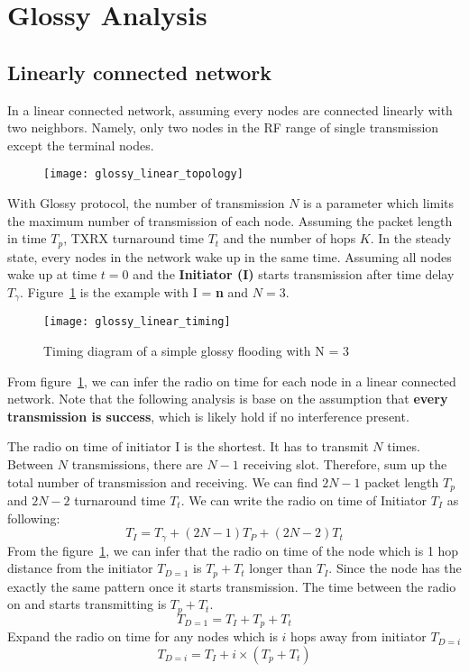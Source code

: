 \clearpage
\section{Glossy Analysis}
\subsection{Linearly connected network}
In a linear connected network, assuming every nodes are connected linearly with two neighbors.
Namely, only two nodes in the RF range of single transmission except the terminal nodes.

\begin{figure}[h]
\centering
	\texttt{[image: glossy\_linear\_topology]}
\end{figure}

With Glossy protocol, the number of transmission $N$ is a parameter which limits the maximum
number of transmission of each node. Assuming the packet length in time $T_p$, TXRX turnaround 
time $T_t$ and the number of hops $K$.
In the steady state, every nodes in the network wake up in the same time. Assuming all nodes
wake up at time $t = 0$ and the {\bf Initiator (I)} starts transmission after time delay 
$T_\gamma$. Figure~\ref{fig:glossy_linear_timing} is the example with I = {\bf n}
and $N = 3$.

\begin{figure}[h]
\centering
	\texttt{[image: glossy\_linear\_timing]}
	\caption{Timing diagram of a simple glossy flooding with N = 3}
	\label{fig:glossy_linear_timing}
\end{figure}

From figure~\ref{fig:glossy_linear_timing}, we can infer the radio on time for each node
in a linear connected network. Note that the following analysis is base on the assumption
that {\bf every transmission is success}, which is likely hold if no interference present.

The radio on time of initiator I is the shortest. It has to transmit $N$ times. Between $N$
transmissions, there are $N-1$ receiving slot. Therefore, sum up the total number of transmission
and receiving. We can find $2N-1$ packet length $T_p$ and $2N-2$ turnaround time $T_t$.
We can write the radio on time of Initiator $T_I$ as following:
\begin{equation}
	T_I = T_\gamma + (2N-1)T_P + (2N-2)T_t
\end{equation}
From the figure~\ref{fig:glossy_linear_timing}, we can infer that the radio on time of the node 
which is 1 hop distance from the initiator $T_{D=1}$ is $T_p + T_t$ longer than $T_I$. Since 
the node has the exactly the same pattern once it starts transmission. The time between the radio on
and starts transmitting is $T_p + T_t$.
\begin{equation}
	T_{D=1} = T_I + T_p + T_t
\end{equation}
Expand the radio on time for any nodes which is $i$ hops away from initiator $T_{D=i}$
\begin{equation}
	T_{D=i} = T_I + i\times(T_p + T_t)
\end{equation}


